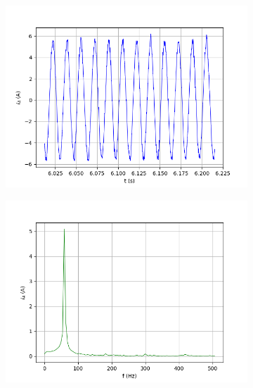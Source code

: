 \begin{figure}[ht]
\centering
 	\begin{subfigure}[b]{0.49\textwidth}
 		\centering
 		\includegraphics[width=\textwidth]{figuras/sim_figures/inversor_e_boost/corrente_ia.png}
 		\caption{}
	\end{subfigure}
     \begin{subfigure}[b]{0.49\textwidth}
  		\centering
  		\includegraphics[width=\textwidth]{figuras/sim_figures/inversor_e_boost/corrente_ia_espectro.png}
  		\caption{}
 	\end{subfigure}
  	\begin{subfigure}[b]{0.49\textwidth}
  		\centering

\end{subfigure}
\end{figure}
